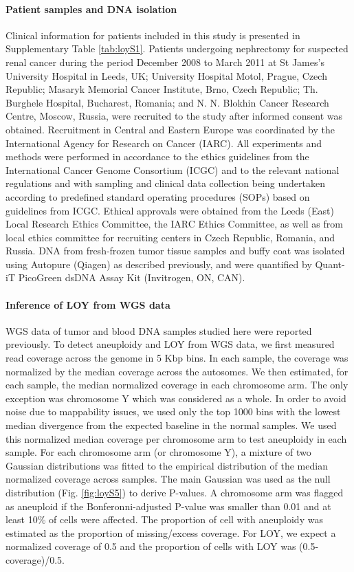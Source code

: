 \paragraph{Patient samples and DNA isolation}
 Clinical information for patients included in this study is presented in Supplementary Table \ref{tab:loyS1}.
Patients undergoing nephrectomy for suspected renal cancer during the period December 2008 to March 2011 at St James's University Hospital in Leeds, UK; University Hospital Motol, Prague, Czech Republic; Masaryk Memorial Cancer Institute, Brno, Czech Republic; Th. Burghele Hospital, Bucharest, Romania; and N. N. Blokhin Cancer Research Centre, Moscow, Russia, were recruited to the study after informed consent was obtained.
Recruitment in Central and Eastern Europe was coordinated by the International Agency for Research on Cancer (IARC).
All experiments and methods were performed in accordance to the ethics guidelines from the International Cancer Genome Consortium (ICGC) and to the relevant national regulations and with sampling and clinical data collection being undertaken according to predefined standard operating procedures (SOPs) based on guidelines from ICGC.
Ethical approvals were obtained from the Leeds (East) Local Research Ethics Committee, the IARC Ethics Committee, as well as from local ethics committee for recruiting centers in Czech Republic, Romania, and Russia.
DNA from fresh-frozen tumor tissue samples and buffy coat was isolated using Autopure (Qiagen) as described previously\cite{Scelo2014}, and were quantified by Quant-iT PicoGreen dsDNA Assay Kit (Invitrogen, ON, CAN).

\paragraph{Inference of LOY from WGS data}

WGS data of tumor and blood DNA samples studied here were reported previously\cite{Scelo2014}.
To detect aneuploidy and LOY from WGS data, we first measured read coverage across the genome in 5 Kbp bins.
In each sample, the coverage was normalized by the median coverage across the autosomes.
We then estimated, for each sample, the median normalized coverage in each chromosome arm.
The only exception was chromosome Y which was considered as a whole.
In order to avoid noise due to mappability issues, we used only the top 1000 bins with the lowest median divergence from the expected baseline in the normal samples.
We used this normalized median coverage per chromosome arm to test aneuploidy in each sample.
For each chromosome arm (or chromosome Y), a mixture of two Gaussian distributions was fitted to the empirical distribution of the median normalized coverage across samples.
The main Gaussian was used as the null distribution (Fig. \ref{fig:loyS5}) to derive P-values.
A chromosome arm was flagged as aneuploid if the Bonferonni-adjusted P-value was smaller than 0.01 and at least 10\% of cells were affected.
The proportion of cell with aneuploidy was estimated as the proportion of missing/excess coverage.
For LOY, we expect a normalized coverage of 0.5 and the proportion of cells with LOY was (0.5-coverage)/0.5.

